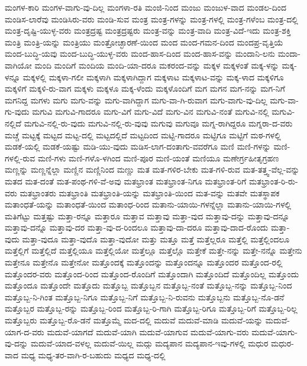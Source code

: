 {ಮಂಗಳ-ಕಾರಿ
ಮಂಗಳ-ವಾಗು-ವು-ದಿಲ್ಲ
ಮಂಗಳಾ-ರತಿ
ಮಂಜಿ-ನಿಂದ
ಮಂಜು
ಮಂಜುಳ-ವಾದ
ಮಂಡಲ-ದಿಂದ
ಮಂಡಿಸ-ಲಾರೆವು
ಮಂಡಿಸಿರು-ವರು
ಮಂಡಿ-ಸುವ
ಮಂತ್ರ
ಮಂತ್ರ-ಗಳನ್ನು
ಮಂತ್ರ-ಗಳಲ್ಲಿ
ಮಂತ್ರ-ಗಳೆಂಬ
ಮಂತ್ರ-ದಲ್ಲಿ
ಮಂತ್ರ-ದೃಷ್ಟಿ-ಯುಳ್ಳ-ವರು
ಮಂತ್ರದ್ರಷ್ಟ
ಮಂತ್ರದ್ರಷ್ಟರು
ಮಂತ್ರ-ವನ್ನು
ಮಂತ್ರ-ವಾದಿ
ಮಂತ್ರ-ವಿದೆ-ಇದು
ಮಂತ್ರ-ಶಕ್ತಿ
ಮಂತ್ರಿ
ಮಂತ್ರಿ-ಯನ್ನು
ಮಂತ್ರಿಯು
ಮಂತ್ರೋಚ್ಛಾರಣೆ-ಯಿಂದ
ಮಂದ
ಮಂದ-ಗಮನ-ದಿಂದ
ಮಂದಪ್ರ-ವೃತ್ತಿಯೆ
ಮಂದ-ಬುದ್ಧಿ-ಯವು
ಮಂದ-ಬುದ್ಧಿ-ಯುಳ್ಳ-ವರು
ಮಂದ-ಹಾಸ-ದಿಂದ
ಮಂದ-ಹಾಸ-ವನ್ನು
ಮಂದಾನಿ-ಲನು
ಮಂದಾ-ವಾಗಿಯೋ
ಮಂದಿ
ಮಂದಿಗೆ
ಮಂದಿಯ
ಮಂದಿ-ಯಾ-ದರೂ
ಮಕರಂದ-ವನ್ನು
ಮಕ್ಕಳ
ಮಕ್ಕಳಂತೆ
ಮಕ್ಕ-ಳನ್ನು
ಮಕ್ಕ-ಳನ್ನೂ
ಮಕ್ಕಳಲ್ಲಿ
ಮಕ್ಕಳಾ-ಗಲೀ
ಮಕ್ಕಳಾಗಿ
ಮಕ್ಕಳಾಗಿದ್ದಾಗ
ಮಕ್ಕಳಾಟ
ಮಕ್ಕಳಾಟ-ವನ್ನು
ಮಕ್ಕ-ಳಾದ
ಮಕ್ಕಳಿಗೂ
ಮಕ್ಕಳಿಗೆ
ಮಕ್ಕಳಿ-ರು-ವಾಗ
ಮಕ್ಕಳು
ಮಕ್ಕಳೂ
ಮಕ್ಕ-ಳೆಂದು
ಮಕ್ಕಳೊಂದಿಗೆ
ಮಗ
ಮಗನ
ಮಗ-ನನ್ನು
ಮಗ-ನಿಗೆ
ಮಗನಿದ್ದ
ಮಗಳು
ಮಗು
ಮಗು-ವನ್ನು
ಮಗು-ವಾಗಿದ್ದಾಗ
ಮಗು-ವಾ-ಗಿ-ರುವಾಗ
ಮಗು-ವಾಗು-ವು-ದಿಲ್ಲ
ಮಗು-ವಾ-ಗು-ವುದು
ಮಗುವಿ
ಮಗುವಿ-ಗಾದರೂ
ಮಗು-ವಿಗೆ
ಮಗು-ವಿದೆ
ಮಗು-ವಿನ
ಮಗುವಿ-ನಂತೆ
ಮಗುವಿ-ನಲ್ಲಿ
ಮಗುವಿ-ನಲ್ಲಿದೆ
ಮಗುವಿ-ನಲ್ಲಿ-ರು-ವುದು
ಮಗುವಿ-ನಲ್ಲಿ-ರು-ವುವು
ಮಗುವು
ಮಗುವೂ
ಮಗ್ನ-ರಾಗಿದ್ದರೂ
ಮಗ್ನರಾ-ದ-ವರು
ಮಚ್ಚೆ
ಮಟ್ಟಕ್ಕೆ
ಮಟ್ಟದ
ಮಟ್ಟ-ದಲ್ಲಿ
ಮಟ್ಟದಲ್ಲಿದೆ
ಮಟ್ಟದಿಂದ
ಮಟ್ಟಿ-ಗಾದರೂ
ಮಟ್ಟಿಗೂ
ಮಟ್ಟಿಗೆ
ಮಠ-ಗಳಲ್ಲಿ
ಮಡಕೆ-ಯಲ್ಲಿ
ಮಡಕೆ-ಯಷ್ಟು
ಮಡಿ-ಯು-ವುದು
ಮಡಿಸ-ಲಾಗ-ದಂತಾಗು-ವವರೆಗೂ
ಮಣಿ
ಮಣಿ-ಗಳನ್ನು
ಮಣಿ-ಗಳಲ್ಲಿ-ರುವ
ಮಣಿ-ಗಳು
ಮಣಿ-ಗಳೊ-ಳಗಿಂದ
ಮಣಿ-ಪೂರ
ಮಣಿ-ಯಂತೆ
ಮಣಿಯೂ
ಮಣೇರ್ಗ್ರಹೀತೃಗ್ರಹಣ
ಮಣ್ಣನ್ನು
ಮಣ್ಣನ್ನೆಲ್ಲಾ
ಮಣ್ಣಿನ
ಮಣ್ಣಿನಿಂದ
ಮಣ್ಣು
ಮತ
ಮತ-ಗಳಿರ-ಬೇಕು
ಮತ-ಗಳಿ-ರುವ
ಮತ-ತತ್ತ್ವ-ವೆಲ್ಲ-ವನ್ನು
ಮತದ
ಮತ-ದಂತೆ
ಮತ-ಪಂಥ-ಗಳಿ-ವೆ-ಅವು
ಮತಭ್ರಾಂತ
ಮತಭ್ರಾಂತ-ನಿಗೂ
ಮತಭ್ರಾಂತ-ರಿಗೆ
ಮತಭ್ರಾಂತ-ರಿ-ರು-ವರು
ಮತಭ್ರಾಂತರು
ಮತಭ್ರಾಂತಿ
ಮತಭ್ರಾಂತಿ-ಯನ್ನು
ಮತಭ್ರಾಂತಿ-ಯಿಂದ
ಮತ-ವನ್ನು
ಮತವೇ
ಮತಸ್ಥಾಪಕ
ಮತಾಂಧತೆ-ಯನ್ನು
ಮತಾಂಧತೆ-ಯಿಂದ
ಮತಾಂಧ-ರಿಂದ
ಮತಾನು-ಯಾಯಿ-ಗಳನ್ನೆಲ್ಲಾ
ಮತಾನು-ಯಾಯಿ-ಗಳಲ್ಲಿ
ಮತಿಗೆಟ್ಟು
ಮತ್ತಷ್ಟು
ಮತ್ತಾ-ರನ್ನೂ
ಮತ್ತಾರೂ
ಮತ್ತಾವ
ಮತ್ತಾವು
ಮತ್ತಾ-ವುದ
ಮತ್ತಾವು-ದನ್ನು
ಮತ್ತಾವು-ದನ್ನೂ
ಮತ್ತಾವು-ದನ್ನೊ
ಮತ್ತಾವು-ದರ
ಮತ್ತಾ-ವು-ದ-ರಿಂದಲೂ
ಮತ್ತಾವು-ದಾ-ದರೂ
ಮತ್ತಾವು-ದಾದ-ರೊಂದು
ಮತ್ತಾ-ವುದು
ಮತ್ತಾ-ವುದೂ
ಮತ್ತಾ-ವುದೊ
ಮತ್ತಾ-ವುದೋ
ಮತ್ತು
ಮತ್ತೂ
ಮತ್ತೆ
ಮತ್ತೆಲ್ಲರೂ
ಮತ್ತೆಲ್ಲಿ
ಮತ್ತೆಲ್ಲಿಂದಲೂ
ಮತ್ತೆಲ್ಲಿಗೆ
ಮತ್ತೆಲ್ಲಿದೆ
ಮತ್ತೆಲ್ಲಿಯೂ
ಮತ್ತೆಲ್ಲಿಯೋ
ಮತ್ತೆಲ್ಲೂ
ಮತ್ತೆಲ್ಲೊ
ಮತ್ತೇಕೆ
ಮತ್ತೇ-ನನ್ನು
ಮತ್ತೇ-ನನ್ನೊ
ಮತ್ತೇನು
ಮತ್ತೇನೂ
ಮತ್ತೇನೊ
ಮತ್ತೇನೋ
ಮತ್ತೊಂದಕ್ಕೆ
ಮತ್ತೊಂದನ್ನು
ಮತ್ತೊಂದನ್ನೂ
ಮತ್ತೊಂದರ
ಮತ್ತೊಂದ-ರಲ್ಲಿ
ಮತ್ತೊಂದರ-ವರು
ಮತ್ತೊಂದ-ರಿಂದ
ಮತ್ತೊಂದ-ರೊಂದಿಗೆ
ಮತ್ತೊಂದಾಗಿ
ಮತ್ತೊಂದಿದೆ
ಮತ್ತೊಂದಿಲ್ಲ
ಮತ್ತೊಂದು
ಮತ್ತೊಂದೂ
ಮತ್ತೊಂದೇ
ಮತ್ತೊದು
ಮತ್ತೊಬ್ಬ
ಮತ್ತೊಬ್ಬನ
ಮತ್ತೊಬ್ಬ-ನಂತೆ
ಮತ್ತೊಬ್ಬ-ನನ್ನು
ಮತ್ತೊಬ್ಬ-ನಿಂದ
ಮತ್ತೊಬ್ಬ-ನಿ-ಗಿಂತ
ಮತ್ತೊಬ್ಬ-ನಿಗೂ
ಮತ್ತೊಬ್ಬ-ನಿಗೆ
ಮತ್ತೊಬ್ಬ-ನಿ-ರುವನು
ಮತ್ತೊಬ್ಬನು
ಮತ್ತೊಬ್ಬ-ನೊ-ಡನೆ
ಮತ್ತೊಬ್ಬರ
ಮತ್ತೊಬ್ಬ-ರನ್ನು
ಮತ್ತೊಬ್ಬ-ರಿಂದ
ಮತ್ತೊಬ್ಬ-ರಿ-ಗಾಗಿ
ಮತ್ತೊಬ್ಬ-ರಿಗೂ
ಮತ್ತೊಬ್ಬ-ರಿಗೆ
ಮತ್ತೊಬ್ಬ-ರಿಲ್ಲ
ಮತ್ತೊಬ್ಬರು
ಮತ್ತೊಬ್ಬ-ರೊ-ಡನೆ
ಮತ್ತೊಮ್ಮೆ
ಮದ-ದಲ್ಲಿ
ಮದುವೆ
ಮದುವೆ-ಮಾಡಿ
ಮದುವೆ-ಯನ್ನು
ಮದುವೆ-ಯಾಗ-ದ-ವರು
ಮದುವೆ-ಯಾಗದೆ
ಮದುವೆ-ಯಾಗಿ
ಮದುವೆ-ಯಾಗುವ
ಮದುವೆ-ಯಾಗು-ವರು
ಮದುವೆ-ಯಾಗು-ವು-ದನ್ನು
ಮದುವೆ-ಯಾದ-ವಳಲ್ಲ
ಮದುವೆ-ಯಿಲ್ಲ
ಮದ್ಗು
ಮದ್ಯಪಾನ
ಮದ್ಯಪಾನ-ಇವು-ಗಳಲ್ಲಿ
ಮಧುರ
ಮಧುರ-ವಾದ
ಮಧ್ಯ
ಮಧ್ಯ-ತರ-ವಾಗಿ-ರ-ಬಹುದು
ಮಧ್ಯದ
ಮಧ್ಯ-ದಲ್ಲಿ
}
